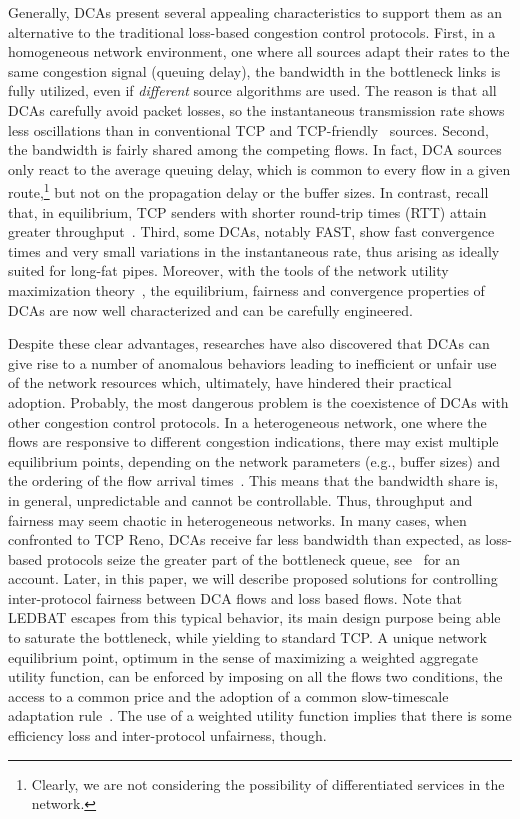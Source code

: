 \documentclass[english,times]{ettauth}
\begin{document}
Generally, DCAs present several appealing characteristics to support them as
an alternative to the traditional loss-based congestion control protocols.
First, in a homogeneous network environment, one where all sources adapt their
rates to the same congestion signal (queuing delay), the bandwidth in the
bottleneck links is fully utilized, even if \emph{different} source algorithms
are used. The reason is that all DCAs carefully avoid packet losses, so the
instantaneous transmission rate shows less oscillations than in conventional
TCP and TCP-friendly~\cite{Floyd00} sources. Second, the bandwidth is fairly
shared among the competing flows. In fact, DCA sources only react to the
average queuing delay, which is common to every flow in a given
route,\footnote{Clearly, we are not considering the possibility of
  differentiated services in the network.} but not on the propagation delay or
the buffer sizes. In contrast, recall that, in equilibrium, TCP senders with
shorter round-trip times (RTT) attain greater
throughput~\cite{Padhye98a,Shakkotai01}. Third, some DCAs, notably FAST, show
fast convergence times and very small variations in the instantaneous rate,
thus arising as ideally suited for long-fat pipes. Moreover, with the tools of
the network utility maximization
theory~\cite{Wei06,Low01,Kunniyur03,Tang05,Wang05,Choi05,Choi06}, the
equilibrium, fairness and convergence properties of DCAs are now well
characterized and can be carefully engineered.

Despite these clear advantages, researches have also discovered that DCAs can
give rise to a number of anomalous behaviors leading to inefficient or unfair
use of the network resources which, ultimately, have hindered their practical
adoption. Probably, the most dangerous problem is the coexistence of DCAs with
other congestion control protocols. In a heterogeneous network, one where the
flows are responsive to different congestion indications, there may exist
multiple equilibrium points, depending on the network parameters (e.g., buffer
sizes) and the ordering of the flow arrival
times~\cite{Tang05,Tan05,Tang06,Tang07}. This means that the bandwidth share
is, in general, unpredictable and cannot be controllable. Thus, throughput and
fairness may seem chaotic in heterogeneous networks. In many cases, when
confronted to TCP Reno, DCAs receive far less bandwidth than expected, as
loss-based protocols seize the greater part of the bottleneck queue,
see~\cite{Kunniyur03,Low02,Bonal99} for an account. Later, in this paper, we
will describe proposed solutions for controlling inter-protocol fairness
between DCA flows and loss based flows. Note that LEDBAT escapes from this
typical behavior, its main design purpose being able to saturate the
bottleneck, while yielding to standard TCP. A unique network equilibrium
point, optimum in the sense of maximizing a weighted aggregate utility
function, can be enforced by imposing on all the flows two conditions, the
access to a common price and the adoption of a common slow-timescale
adaptation rule~\cite{Tang10}. The use of a weighted utility function implies
that there is some efficiency loss and inter-protocol unfairness, though.
\end{document}
